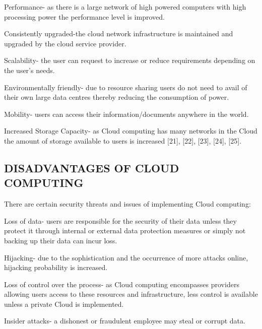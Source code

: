 \documentclass[10pt,journal,compsoc]{IEEEtran}
\begin{document}
\vspace{2mm}
Performance- as there is a large network of high powered computers with high processing power the performance level is improved. 

\vspace{2mm}
Consistently upgraded-the cloud network infrastructure is maintained and upgraded by the cloud service provider. 

\vspace{2mm}
Scalability- the user can request to increase or reduce requirements depending on the user’s needs. 

\vspace{2mm}
Environmentally friendly- due to resource sharing users do not need to avail of their own large data centres thereby reducing the consumption of power. 

\vspace{2mm}
Mobility- users can access their information/documents anywhere in the world. 

\vspace{2mm}
Increased Storage Capacity- as Cloud computing has many networks in the Cloud the amount of storage available to users is increased [21], [22], [23], [24], [25].

\subsection{DISADVANTAGES OF CLOUD COMPUTING }

\vspace{2mm}
There are certain security threats and issues of implementing Cloud computing: 

\vspace{2mm}
Loss of data- users are responsible for the security of their data unless they protect it through internal or external data protection measures or simply not backing up their data can incur loss. 

\vspace{2mm}
Hijacking- due to the sophistication and the occurrence of more attacks online, hijacking probability is increased. 

\vspace{2mm}
Loss of control over the process- as Cloud computing encompasses providers allowing users access to these resources and infrastructure, less control is available unless a private Cloud is implemented. 

\vspace{2mm}
Insider attacks- a dishonest or fraudulent employee may steal or corrupt data. 
\end{document}
